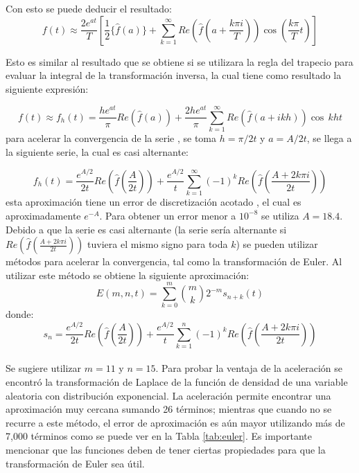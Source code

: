 \documentclass[11pt]{article}
\numberwithin{equation}{section} %
\begin{document}
Con esto se puede deducir el resultado:
\begin{equation}
f(t) \approx \frac{2e^{at}}{T}\left[\frac{1}{2} \{\hat{f}(a) \}+\sum_{k=1}^{\infty}Re\left(\hat{f}\left(a+\frac{k\pi i}{T}\right)\right)\cos\left(\frac{k\pi}{T}t\right)\right]
\end{equation}

Esto es similar al resultado que se obtiene si se utilizara la regla del trapecio para evaluar la integral de la transformación inversa, la cual tiene como resultado la siguiente expresión:

\[
f(t)\approx f_h(t)=\frac{he^{at}}{\pi} Re(\hat{f}(a))+\frac{2he^{at}}{\pi}\sum_{k=1}^{\infty}Re(\hat{f}(a+ikh))\cos\,kht
\]
para acelerar la convergencia de la serie \cite{abate1995}, se toma $h=\pi/2t$ y $a=A/2t$, se llega a la siguiente serie, la cual es casi alternante:

\[
f_h(t)=\frac{e^{A/2}}{2t} Re\left(\hat{f}\left(\frac{A}{2t}\right)\right)+\frac{e^{A/2}}{t}\sum_{k=1}^{\infty}(-1)^k Re\left(\hat{f}\left(\frac{A+2k\pi i}{2t}\right)\right)
\]
esta aproximación tiene un error de discretización acotado \cite{abate1995}, el cual es aproximadamente $e^{-A}$. Para obtener un error menor a $10^{-8}$ se utiliza $A=18.4$.\\

Debido a que la serie es casi alternante (la serie sería alternante si $Re\left(\hat{f}\left(\frac{A+2k\pi i}{2t}\right)\right)
$ tuviera el mismo signo para toda $k$) se pueden utilizar métodos para acelerar la convergencia, tal como la transformación de Euler. Al utilizar este método se obtiene la siguiente aproximación:
\[
E(m,n,t)=\sum_{k=0}^m \binom mk 2^{-m}s_{n+k}(t)
\]
donde:
\[
s_n=\frac{e^{A/2}}{2t} Re\left(\hat{f}\left(\frac{A}{2t}\right)\right)+\frac{e^{A/2}}{t}\sum_{k=1}^{n}(-1)^k Re\left(\hat{f}\left(\frac{A+2k\pi i}{2t}\right)\right)
\]
\\

Se sugiere utilizar $m=11$ y $n=15$. Para probar la ventaja de la aceleración se encontró la transformación de Laplace de la función de densidad de una variable aleatoria con distribución exponencial. La aceleración permite encontrar una aproximación muy cercana sumando 26 términos; mientras que cuando no se recurre a este método, el error de aproximación es aún mayor utilizando más de 7,000 términos como se puede ver en la Tabla \ref{tab:euler}. Es importante mencionar que las funciones deben de tener ciertas propiedades para que la transformación de Euler sea útil.\\
\end{document}
